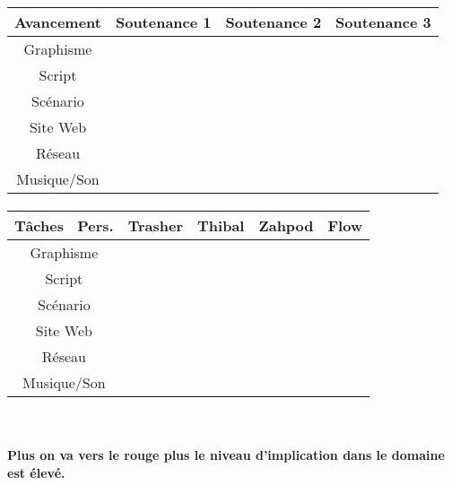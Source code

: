 \documentclass[12pt,a4paper]{article}
\begin{document}
\paragraph{}
\begin{center}
\begin{tabular}{|c|c|c|c|}
\hline 
\rowcolor{cyan} Avancement & Soutenance 1 & Soutenance 2 & Soutenance 3 \\ 
\hline 
\cellcolor{lightgray}Graphisme & \cellcolor{yellow} & \cellcolor{yellow} & \cellcolor{orange} \\ 
\hline 
\cellcolor{lightgray}Script & \cellcolor{yellow} &  \cellcolor{orange} & \cellcolor{red}  \\ 
\hline 
\cellcolor{lightgray}Scénario & \cellcolor{orange} &  \cellcolor{orange} &  \cellcolor{red} \\ 
\hline 
\cellcolor{lightgray}Site Web & \cellcolor{yellow} &  \cellcolor{orange} & \cellcolor{red}  \\ 
\hline
\cellcolor{lightgray}Réseau & \cellcolor{yellow} & \cellcolor{yellow} & \cellcolor{red} \\ 
\hline 
\cellcolor{lightgray}Musique/Son &  & \cellcolor{yellow} &  \cellcolor{orange}  \\ 
\hline 
\end{tabular}
\paragraph{}
\begin{tabular}{|c|c|c|c|c|}
 \hline 
 \rowcolor{cyan}Tâches \ Pers. & Trasher & Thibal & Zahpod & Flow \\ 
 \hline 
 \cellcolor{lightgray}Graphisme & \cellcolor{red} &  &  & \cellcolor{yellow} \\ 
 \hline 
 \cellcolor{lightgray}Script &  & \cellcolor{yellow} & \cellcolor{red} & \cellcolor{yellow} \\ 
 \hline 
 \cellcolor{lightgray}Scénario & \cellcolor{yellow} & \cellcolor{yellow} & \cellcolor{yellow} & \cellcolor{yellow} \\ 
 \hline 
 \cellcolor{lightgray}Site Web &  & \cellcolor{red} &  &  \\ 
 \hline 
 \cellcolor{lightgray} Réseau & \cellcolor{orange} &  & \cellcolor{yellow} & \cellcolor{orange} \\ 
 \hline 
 \cellcolor{lightgray}Musique/Son &  & \cellcolor{yellow} &  & \cellcolor{yellow} \\ 
 \hline 
 \end{tabular}
 \
\paragraph{Plus on va vers le rouge plus le niveau d'implication dans le domaine est élevé.} 
\paragraph{}
 \begin{tabular}{|c|c|c|c|}
 \hline 
\cellcolor{white} & \cellcolor{yellow} & \cellcolor{orange} & \cellcolor{red} \\ 
 \hline 
 \end{tabular}

\end{center}
\newpage
\end{document}

